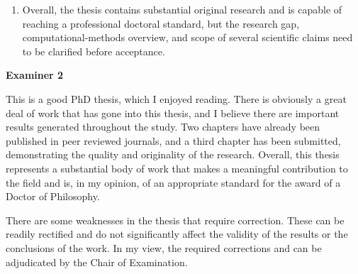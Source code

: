 \documentclass[12pt,a4paper]{article}
\begin{document}
\begin{enumerate}[leftmargin=*]
\item Overall, the thesis contains substantial original research and is capable of reaching a professional doctoral standard, but the research gap, computational-methods overview, and scope of several scientific claims need to be clarified before acceptance.

\end{enumerate}

\bigskip
\textbf{Examiner 2}

This is a good PhD thesis, which I enjoyed reading. There is obviously a great deal of work that has gone into this thesis, and I believe there are important results generated throughout the study. Two chapters have already been published in peer reviewed journals, and a third chapter has been submitted, demonstrating the quality and originality of the research. Overall, this thesis represents a substantial body of work that makes a meaningful contribution to the field and is, in my opinion, of an appropriate standard for the award of a Doctor of Philosophy.

There are some weaknesses in the thesis that require correction. These can be readily rectified and do not significantly affect the validity of the results or the conclusions of the work. In my view, the required corrections and can be adjudicated by the Chair of Examination.
\end{document}
